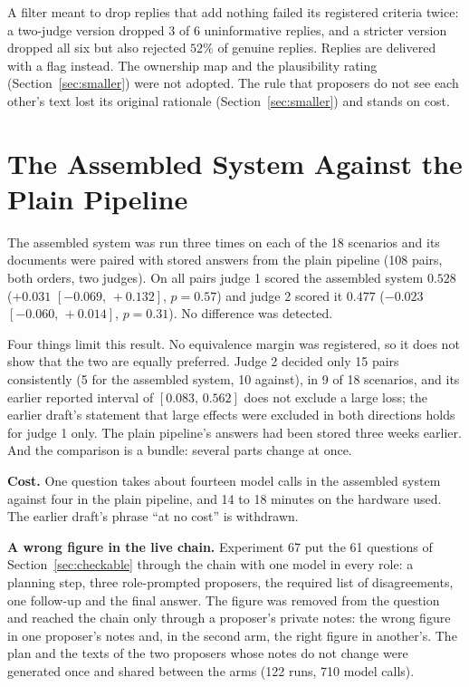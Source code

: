 \documentclass[10pt,twocolumn]{article}
\newcommand{\ci}[2]{\ensuremath{[#1,\,#2]}}
\begin{document}
A filter meant to drop replies that add nothing failed its registered
criteria twice: a two-judge version dropped $3$ of $6$ uninformative
replies, and a stricter version dropped all six but also rejected
$52\%$ of genuine replies. Replies are delivered with a flag instead.
The ownership map and the plausibility rating
(Section~\ref{sec:smaller}) were not adopted. The rule that proposers
do not see each other's text lost its original rationale
(Section~\ref{sec:smaller}) and stands on cost.

\section{The Assembled System Against the Plain Pipeline}
\label{sec:headtohead}

The assembled system was run three times on each of the 18 scenarios
and its documents were paired with stored answers from the plain
pipeline (108 pairs, both orders, two judges). On all pairs judge 1
scored the assembled system $0.528$ ($+0.031$ \ci{-0.069}{+0.132},
$p=0.57$) and judge 2 scored it $0.477$ ($-0.023$
\ci{-0.060}{+0.014}, $p=0.31$). No difference was detected.

Four things limit this result. No equivalence margin was registered,
so it does not show that the two are equally preferred. Judge 2 decided
only 15 pairs consistently (5 for the assembled system, 10 against), in
9 of 18 scenarios, and its earlier reported interval of
\ci{0.083}{0.562} does not exclude a large loss; the earlier draft's
statement that large effects were excluded in both directions holds for
judge 1 only. The plain pipeline's answers had been stored three weeks
earlier. And the comparison is a bundle: several parts change at once.

\textbf{Cost.} One question takes about fourteen model calls in the
assembled system against four in the plain pipeline, and 14 to 18
minutes on the hardware used. The earlier draft's phrase ``at no cost''
is withdrawn.

\textbf{A wrong figure in the live chain.} Experiment 67 put the 61
questions of Section~\ref{sec:checkable} through the chain with one
model in every role: a planning step, three role-prompted proposers,
the required list of disagreements, one follow-up and the final answer.
The figure was removed from the question and reached the chain only
through a proposer's private notes: the wrong figure in one proposer's
notes and, in the second arm, the right figure in another's. The plan
and the texts of the two proposers whose notes do not change were
generated once and shared between the arms (122 runs, 710 model calls).
\end{document}
